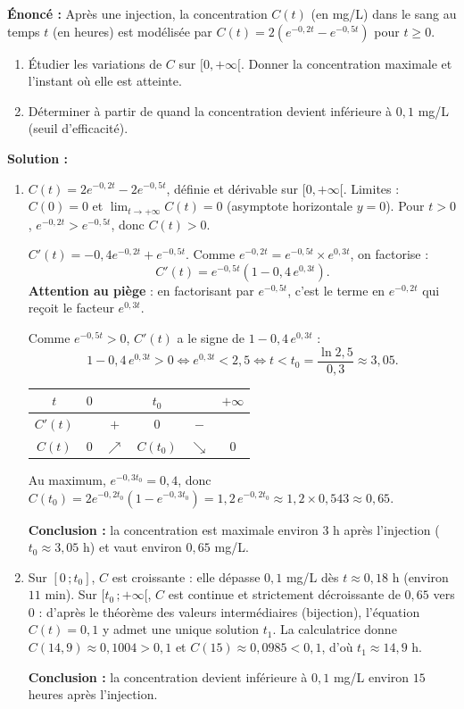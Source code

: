 \documentclass[11pt]{article}
\begin{document}
\begin{exoresolu}
\textbf{Énoncé :} Après une injection, la concentration $C(t)$ (en mg/L) dans le sang au temps $t$ (en heures) est modélisée par $C(t) = 2(e^{-0,2t} - e^{-0,5t})$ pour $t \geq 0$.
\begin{enumerate}
  \item Étudier les variations de $C$ sur $[0, +\infty[$. Donner la concentration maximale et l'instant où elle est atteinte.
  \item Déterminer à partir de quand la concentration devient inférieure à $0,1$ mg/L (seuil d'efficacité).
\end{enumerate}
\tcblower
\textbf{Solution :}
\begin{enumerate}
  \item $C(t) = 2e^{-0,2t} - 2e^{-0,5t}$, définie et dérivable sur $[0, +\infty[$.
  Limites : $C(0)=0$ et $\lim_{t\to+\infty} C(t) = 0$ (asymptote horizontale $y=0$). Pour $t>0$, $e^{-0,2t} > e^{-0,5t}$, donc $C(t)>0$.

  $C'(t) = -0,4e^{-0,2t} + e^{-0,5t}$. Comme $e^{-0,2t} = e^{-0,5t}\times e^{0,3t}$, on factorise :
  \[ C'(t) = e^{-0,5t}\left(1 - 0,4\,e^{0,3t}\right). \]
  \textbf{Attention au piège} : en factorisant par $e^{-0,5t}$, c'est le terme en $e^{-0,2t}$ qui reçoit le facteur $e^{0,3t}$.

  Comme $e^{-0,5t}>0$, $C'(t)$ a le signe de $1 - 0,4\,e^{0,3t}$ :
  \[ 1 - 0,4\,e^{0,3t} > 0 \iff e^{0,3t} < 2,5 \iff t < t_0 = \frac{\ln 2,5}{0,3} \approx 3,05. \]
  \begin{center}
  \begin{tabular}{|c|ccccc|}
  \hline
  $t$ & $0$ & & $t_0$ & & $+\infty$ \\ \hline
  $C'(t)$ & & $+$ & $0$ & $-$ & \\ \hline
  $C(t)$ & $0$ & $\nearrow$ & $C(t_0)$ & $\searrow$ & $0$ \\ \hline
  \end{tabular}
  \end{center}
  Au maximum, $e^{-0,3t_0} = 0,4$, donc $C(t_0) = 2e^{-0,2t_0}\left(1 - e^{-0,3t_0}\right) = 1,2\,e^{-0,2t_0} \approx 1,2\times 0,543 \approx 0,65$.

  \textbf{Conclusion :} la concentration est maximale environ $3$ h après l'injection ($t_0\approx 3,05$ h) et vaut environ $0,65$ mg/L.
  \item Sur $[0\,;t_0]$, $C$ est croissante : elle dépasse $0,1$ mg/L dès $t\approx 0,18$ h (environ $11$ min). Sur $[t_0\,;+\infty[$, $C$ est continue et strictement décroissante de $0,65$ vers $0$ : d'après le théorème des valeurs intermédiaires (bijection), l'équation $C(t)=0,1$ y admet une unique solution $t_1$.
  La calculatrice donne $C(14,9)\approx 0,1004 > 0,1$ et $C(15)\approx 0,0985 < 0,1$, d'où $t_1 \approx 14,9$ h.

  \textbf{Conclusion :} la concentration devient inférieure à $0,1$ mg/L environ $15$ heures après l'injection.
\end{enumerate}
\end{exoresolu}
\end{document}
